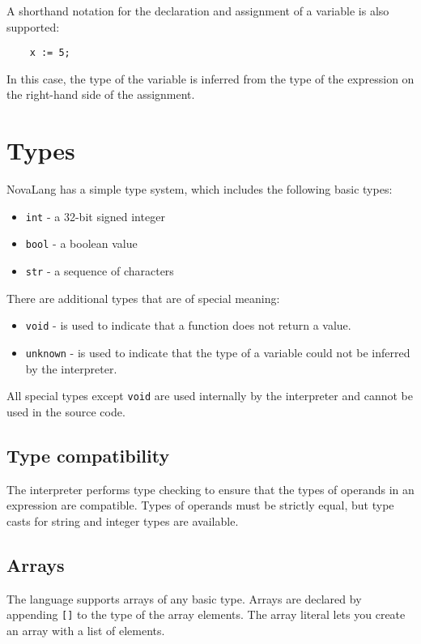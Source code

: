 \documentclass[conference]{IEEEtran}
\begin{document}
A shorthand notation for the declaration and assignment of a variable is also supported:

\begin{lstlisting}
    x := 5;
\end{lstlisting}

In this case, the type of the variable is inferred from the type of the expression on the right-hand side of the assignment.

\section{Types}

NovaLang has a simple type system, which includes the following basic types:
\begin{itemize}
    \item \texttt{int} - a 32-bit signed integer
    \item \texttt{bool} - a boolean value
    \item \texttt{str} - a sequence of characters
\end{itemize}

There are additional types that are of special meaning:
\begin{itemize}
    \item \texttt{void} - is used to indicate that a function does not return a value.
    \item \texttt{unknown} - is used to indicate that the type of a variable could not be inferred by the interpreter.
\end{itemize}

All special types except \texttt{void} are used internally by the interpreter and cannot be used in the source code.

\subsection{Type compatibility}

The interpreter performs type checking to ensure that the types of operands in an expression are compatible.
Types of operands must be strictly equal, but type casts for string and integer types are available.

\subsection{Arrays}

The language supports arrays of any basic type.
Arrays are declared by appending \texttt{[]} to the type of the array elements.
The array literal lets you create an array with a list of elements.
\end{document}
